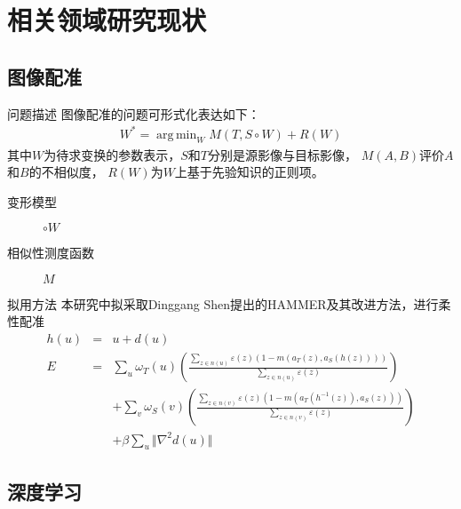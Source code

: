\documentclass {beamer}
\DeclareMathOperator*{\argmin}{arg\,min}
\begin{document}


\section{相关领域研究现状}

\subsection{图像配准}

\begin{frame}{问题描述}
    图像配准的问题可形式化表达如下\cite{sotiras2013deformable}：
    \begin{eqnarray*}
        W^* = \argmin_{W} M(T, S \circ W) + R(W)
    \end{eqnarray*}
    其中$W$为待求变换的参数表示，$S$和$T$分别是源影像与目标影像，
    $M(A, B)$评价$A$和$B$的不相似度，
    $R(W)$为$W$上基于先验知识的正则项。
    \begin{description}
        \item[变形模型] $\circ W$
        \item[相似性测度函数] $M$
    \end{description}
\end{frame}

\begin{frame}{拟用方法}
    本研究中拟采取Dinggang Shen提出的HAMMER及其改进方法，进行柔性配准
    \cite{shen2002hammer,shen2007image}
    \footnotesize
    \begin{eqnarray*}
        h(u) &=& u + d(u) \\
        E &=& \sum_{u}
        \omega_T(u)\left(\frac{
            \sum_{z\in n(u)}\varepsilon(z)(1-m(a_T(z), a_S(h(z))))}{
                \sum_{z\in n(u)}\varepsilon(z)}\right) \\
        & & + \sum_{v}\omega_S(v)\left(\frac{
            \sum_{z\in n(v)}\varepsilon(z)(1-m(a_T(h^{-1}(z)), a_S(z)))}{
                \sum_{z\in n(v)}\varepsilon(z)}\right) \\
        & & + \beta\sum_u\Vert\nabla^2d(u)\Vert
    \end{eqnarray*}
\end{frame}


\subsection{深度学习}
\end{document}
